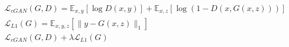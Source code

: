 \begin{align}
    \mathcal{L}_{cGAN}(G, D)=\mathbb{E}_{x, y}[\log D(x, y)]+\mathbb{E}_{x, z}[\log (1-D(x, G(x, z)))] \label{eq:pix2pix1}\\
    \mathcal{L}_{L 1}(G)=\mathbb{E}_{x, y, z}\left[\|y-G(x, z)\|_{1}\right] \label{peq:ix2pix2}\\
    \mathcal{L}_{c G A N}(G, D)+\lambda \mathcal{L}_{L 1}(G) \label{eq:pix2pix3}
\end{align}

